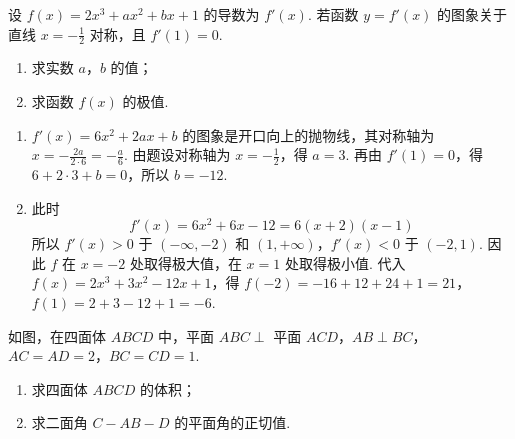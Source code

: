 \begin{problem}
设 \( f(x) = 2x^{3} + ax^{2} + bx + 1 \) 的导数为 \( f'(x) \). 若函数 \( y = f'(x) \) 的图象关于直线 \( x = -\frac{1}{2} \) 对称，且 \( f'(1) = 0 \).
\begin{enumerate}
\item 求实数 \(a\)，\(b\) 的值；
\item 求函数 \( f(x) \) 的极值.
\end{enumerate}
\end{problem}

\begin{solution}
\begin{enumerate}
\item
\(f'(x)=6x^{2}+2ax+b\) 的图象是开口向上的抛物线，其对称轴为
\(x=-\frac{2a}{2\cdot6}=-\frac{a}{6}\). 由题设对称轴为 \(x=-\frac12\)，得 \(a=3\). 再由 \(f'(1)=0\)，得
\(6+2\cdot3+b=0\)，所以 \(b=-12\).
\item 此时
\[
f'(x)=6x^{2}+6x-12=6(x+2)(x-1)
\]
所以 \(f'(x)>0\) 于 \((-\infty,-2)\) 和 \((1,+\infty)\)，\(f'(x)<0\) 于 \((-2,1)\). 因此 \(f\) 在 \(x=-2\) 处取得极大值，在 \(x=1\) 处取得极小值. 代入
\(f(x)=2x^{3}+3x^{2}-12x+1\)，得
\(f(-2)=-16+12+24+1=21\)，\(f(1)=2+3-12+1=-6\).
\end{enumerate}
\end{solution}

\begin{problem}
如图，在四面体 \(ABCD\) 中，平面 \(ABC \perp\) 平面 \(ACD\)，\(AB \perp BC\)，\(AC = AD = 2\)，\(BC = CD = 1\).
\begin{enumerate}
\item 求四面体 \(ABCD\) 的体积；
\item 求二面角 \(C - AB - D\) 的平面角的正切值.
\end{enumerate}
\end{problem}

